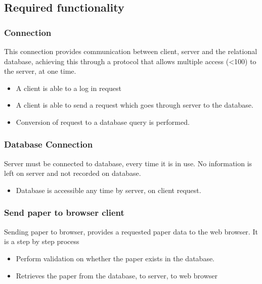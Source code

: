 \documentclass[hidelinks,a4paper,12pt]{article}
\begin{document}
	\subsection{Required functionality}
	
	\subsubsection{Connection}
	
	This connection provides communication between client, server     
	and the relational database, achieving this through a 	protocol 
	that allows multiple access (<100) to the server, at 	one time.
	\begin{itemize}
		\item A client is able to a log in request 
		
		\item A client is able to send a request which goes through server 	to the database.
		
		\item Conversion of request to a database query is performed.      	
	\end{itemize}
	
	\subsubsection{Database Connection}
	
	Server must be connected to database, every time it is in use. 
	No information is left on server and not recorded on database.  
	
	\begin{itemize}
			\item Database is accessible any time by server, on client request. 
	\end{itemize}
	
	
		\subsubsection{Send paper to browser client}
	
	Sending paper to browser, provides a requested paper data to the  
	web browser. It is a step by step process
	
	\begin{itemize}
	\item Perform validation on whether the paper exists in the database.
	\item Retrieves the paper from the database, to server, to web browser
\end{itemize}
	
\end{document}
